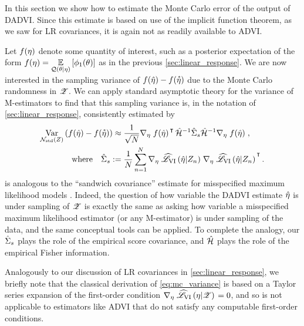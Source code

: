 In this section we show how to estimate the Monte Carlo error of the output of
DADVI. Since this estimate is based on use of the implicit function theorem, as
we saw for LR covariances, it is again not as readily available to ADVI.

Let $f(\eta)$ denote some quantity of interest, such as a posterior
expectation of the form $f(\eta) = \underset{\mathcal{Q}(\theta \vert
\eta)}{\mathbb{E}}\left[\phi_1(\theta)\right]$ as in the previous \cref{sec:linear_response}.  We are
now interested in the sampling variance of $f(\hat{\eta}) - f(\accentset{*}{\eta})$ due
to the Monte Carlo randomness in $\mathscr{Z}$. We can apply standard asymptotic theory
for the variance of M-estimators to find that this sampling variance is, in the
notation of \cref{sec:linear_response}, consistently estimated by
%
\begin{align}\label{eq:mc_variance}
%
\var{\normz}{\fun(\etahat) - \fun(\etastar)}
\approx{}&
\frac{1}{\sqrt{N}} \grad{\eta}{\fun(\etaopt)}^\trans
\h^{-1} \scorecov \h^{-1}
\grad{\eta}{\fun(\etaopt)},  \\
\quad\textrm{where}\quad
\scorecov :={}&
\meann \grad{\eta}{\klobj{\etahat | \z_n}}
\grad{\eta}{\klobj{\etahat | \z_n}}^\trans. \nonumber
%
\end{align}
%
 is analogous to the ``sandwich covariance'' estimate for
misspecified maximum likelihood models \citep{stefanski:2002:mestimation}.
Indeed, the question of how variable the DADVI estimate $\hat{\eta}$ is under
sampling of $\mathscr{Z}$ is exactly the same as asking how variable a misspecified
maximum likelihood estimator (or any M-estimator) is under sampling of the data,
and the same conceptual tools can be applied.  To complete the analogy, our
$\hat{\Sigma}_{s}$ plays the role of the empirical score covariance, and $\hat{\mathcal{H}}$ plays the
role of the empirical Fisher information.

Analogously to our discussion of LR covariances in \cref{sec:linear_response},
we briefly note that the classical derivation of \cref{eq:mc_variance} is based
on a Taylor series expansion of the first-order condition
$\nabla_{\eta} \left. \widehat{\mathscr{L}}_{\mathrm{VI}}\left(\eta \vert \mathscr{Z}\right) \right. = 0$, and so is not applicable to
estimators like ADVI that do not satisfy any computable first-order conditions.